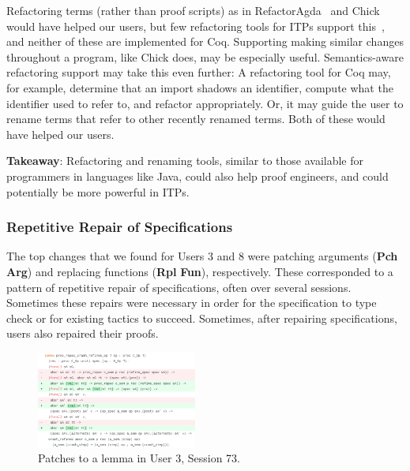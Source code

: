 Refactoring terms (rather than proof scripts) as in
RefactorAgda~\cite{wibergh2019} and Chick~\cite{robert2018}
would have helped our users, but few refactoring tools for
ITPs support this~\cite{PGL-045}, and neither of these are implemented
for Coq.
Supporting making similar changes throughout a program, like Chick does,
may be especially useful.
Semantics-aware refactoring support may take this even further:
A refactoring tool for Coq may, for example, determine that an import
shadows an identifier, compute what the identifier used to refer to,
and refactor appropriately.
Or, it may guide the user to rename terms that refer to other
recently renamed terms.
Both of these would have helped our users.

\begin{displayquote}
  \textbf{Takeaway}:
  Refactoring and renaming tools,
  similar to those available for programmers in languages like Java,
  could also help proof engineers,
  and could potentially be more powerful in ITPs.
\end{displayquote}

\subsubsection{Repetitive Repair of Specifications}
\label{sec:pat3}

The top changes that we found for Users 3 and 8 were 
patching arguments (\textbf{Pch} \textbf{Arg}) and replacing functions
(\textbf{Rpl} \textbf{Fun}), respectively.
These corresponded to a pattern of repetitive repair of specifications,
often over several sessions.
Sometimes these repairs were necessary in order for the specification to
type check or for existing tactics to succeed.
Sometimes, after repairing specifications, users also repaired their proofs.

\begin{figure}
  \includegraphics[width=0.47\textwidth]{maintenance/fig/patch.png}
  \caption{Patches to a lemma in User 3, Session 73.}
  \label{fig:patch}
\end{figure}

